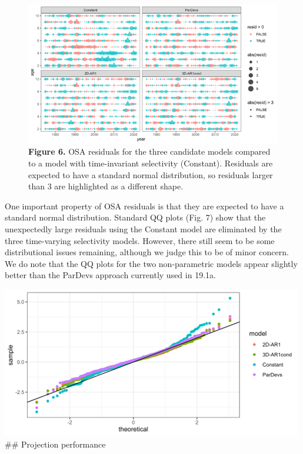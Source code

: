 \documentclass[
]{article}
\begin{document}
{{{\begin{figure}
\hypertarget{fig:figure6}{%
\centering
\includegraphics{Results/Figure6_osa_tmb.png}
\caption{\textbf{Figure 6.} OSA residuals for the three candidate models
compared to a model with time-invariant selectivity (Constant).
Residuals are expected to have a standard normal distribution, so
residuals larger than 3 are highlighted as a different
shape.}\label{fig:figure6}
}
\end{figure}

One important property of OSA residuals is that they are expected to
have a standard normal distribution. Standard QQ plots (Fig. 7) show
that the unexpectedly large residuals using the Constant model are
eliminated by the three time-varying selectivity models. However, there
still seem to be some distributional issues remaining, although we judge
this to be of minor concern. We do note that the QQ plots for the two
non-parametric models appear slightly better than the ParDevs approach
currently used in 19.1a.

\includegraphics{Results/Figure7_qqplot.png} \#\# Projection performance

}}}
\end{document}
